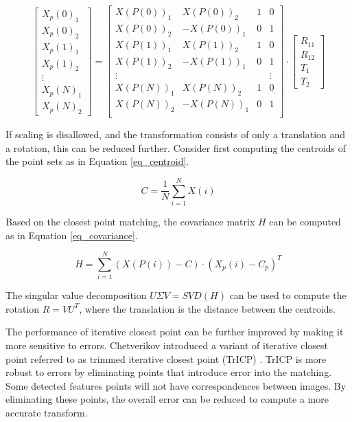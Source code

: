 \documentclass{article}
\begin{document}
\begin{equation}
\begin{bmatrix}
X_p(0)_1 \\
X_p(0)_2 \\
X_p(1)_1 \\
X_p(1)_2 \\
\vdots \\
X_p(N)_1 \\
X_p(N)_2
\end{bmatrix}
=
\begin{bmatrix}
X(P(0))_1 & X(P(0))_2 & 1 & 0 \\
X(P(0))_2 & -X(P(0))_1 & 0 & 1 \\
X(P(1))_1 & X(P(1))_2 & 1 & 0 \\
X(P(1))_2 & -X(P(1))_1 & 0 & 1 \\
\vdots & & & \vdots \\
X(P(N))_1 & X(P(N))_2 & 1 & 0 \\
X(P(N))_2 & -X(P(N))_1 & 0 & 1 \\
\end{bmatrix}
\cdot
\begin{bmatrix}
R_{11} \\
R_{12} \\
T_1 \\
T_2
\end{bmatrix}
\label{eq_reduced_icp_matrix}
\end{equation}

If scaling is disallowed, and the transformation consists of only a translation and a rotation, this can be reduced further. Consider first computing the centroids of the point sets as in Equation \ref{eq_centroid}.

\begin{equation}
C = \frac{1}{N}\sum\limits_{i=1}^{N}X(i)
\label{eq_centroid}
\end{equation}

Based on the closest point matching, the covariance matrix $H$ can be computed as in Equation \ref{eq_covariance}.

\begin{equation}
H=\sum\limits_{i=1}^{N} (X(P(i)) - C) \cdot (X_p(i) - C_p)^T
\label{eq_covariance}
\end{equation}

The singular value decomposition $U\Sigma V = SVD(H)$ can be used to compute the rotation $R=VU^T$, where the translation is the distance between the centroids.

The performance of iterative closest point can be further improved by making it more sensitive to errors. Chetverikov introduced a variant of iterative closest point referred to as trimmed iterative closest point (TrICP) \cite{chetverikov_trimmed_2002}. TrICP is more robust to errors by eliminating points that introduce error into the matching. Some detected features points will not have correspondences between images. By eliminating these points, the overall error can be reduced to compute a more accurate transform.
\end{document}
